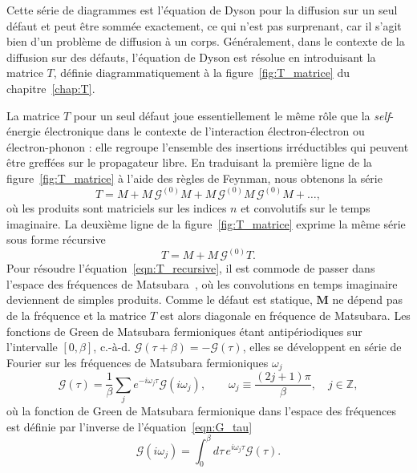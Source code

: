 Cette série de diagrammes est l'équation de Dyson pour la diffusion sur un seul défaut et peut être sommée exactement, ce qui n'est pas surprenant, car il s'agit bien d'un problème de diffusion à un corps. Généralement, dans le contexte de la diffusion sur des défauts, l'équation de Dyson est résolue en introduisant la matrice $T$, définie diagrammatiquement à la figure~\ref{fig:T_matrice} du chapitre~\ref{chap:T}.

La matrice $T$ pour un seul défaut joue essentiellement le même rôle que la \textit{self}-énergie électronique dans le contexte de l'interaction électron-électron ou électron-phonon : elle regroupe l'ensemble des insertions irréductibles qui peuvent être greffées sur le propagateur libre. En traduisant la première ligne de la figure~\ref{fig:T_matrice} à l'aide des règles de Feynman, nous obtenons la série
\begin{equation}
    T = M + M\,\mathcal{G}^{(0)}M + M\,\mathcal{G}^{(0)}M\,\mathcal{G}^{(0)}M+\dots,
    \label{eqn:T_serie}
\end{equation}
où les produits sont matriciels sur les indices $n$ et convolutifs sur le temps imaginaire. La deuxième ligne de la figure~\ref{fig:T_matrice} exprime la même série sous forme récursive
\begin{equation}
    T = M + M\,\mathcal{G}^{(0)}T.
    \label{eqn:T_recursive}
\end{equation}
Pour résoudre l'équation~\eqref{eqn:T_recursive}, il est commode de passer dans l'espace des fréquences de Matsubara~\cite{matsubaraNewApproachQuantumStatistical1955}, où les convolutions en temps imaginaire deviennent de simples produits. Comme le défaut est statique, $\bm M$ ne dépend pas de la fréquence et la matrice $T$ est alors diagonale en fréquence de Matsubara. Les fonctions de Green de Matsubara fermioniques étant antipériodiques sur l'intervalle $[0,\beta]$, c.-à-d. $\mathcal{G}(\tau+\beta)=-\mathcal{G}(\tau)$, elles se développent en série de Fourier sur les fréquences de Matsubara fermioniques $\omega_j$
\begin{equation}
    \mathcal{G}(\tau) = \frac{1}{\beta}\sum_{j}e^{-i\omega_j\tau}\mathcal{G}(i\omega_j),\qquad \omega_j\equiv \frac{(2j+1)\pi}{\beta},\quad j \in\mathbb{Z},\label{eqn:G_tau}
\end{equation}
où la fonction de Green de Matsubara fermionique dans l'espace des fréquences est définie par l'inverse de l'équation~\eqref{eqn:G_tau}
\begin{equation}
    \mathcal{G}(i\omega_j) = \int_0^\beta d\tau\, e^{i\omega_j\tau}\mathcal{G}(\tau).\label{eqn:G_w}
\end{equation}
